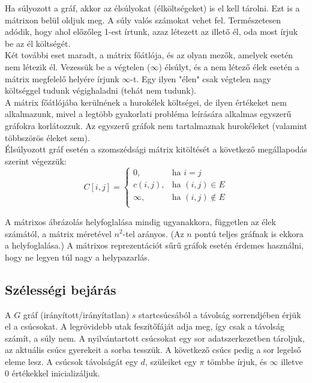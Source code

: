 \documentclass[margin=0px]{article}
\begin{document}
    \noindent Ha súlyozott a gráf, akkor az élsúlyokat (élköltségeket) is el kell tárolni. Ezt is a mátrixon belül oldjuk meg. A súly valós számokat vehet fel. Természetesen adódik, hogy ahol előzőleg 1-est írtunk, azaz létezett az illető él, oda most írjuk be az él költségét.\\

    \noindent Két további eset maradt, a mátrix főátlója, és az olyan mezők, amelyek esetén nem létezik él. Vezessük be a végtelen ($\infty$) élsúlyt, és a nem létező élek esetén a mátrix megfelelő helyére írjunk $\infty$-t. Egy ilyen "élen" csak végtelen nagy költséggel tudunk végighaladni (tehát nem tudunk).\\

    \noindent A mátrix főátlójába kerülnének a hurokélek költségei, de ilyen értékeket nem alkalmazunk, mivel a legtöbb gyakorlati probléma leírására alkalmas egyszerű gráfokra korlátozzuk. Az egyszerű gráfok nem tartalmaznak hurokéleket (valamint többszörös éleket sem).\\

    \noindent Élsúlyozott gráf esetén a szomszédsági mátrix kitöltését a következő megállapodás szerint végezzük:
    \[
        C[i,j] = \left\{\begin{array}{lr}
        0, & \text{ha } i = j\\
        c(i, j), & \text{ha } (i, j) \in E\\
        \infty, & \text{ha } (i, j) \not\in E\\
        \end{array}\right.
    \]

    \noindent A mátrixos ábrázolás helyfoglalása mindig ugyanakkora, független az élek számától, a mátrix méretével $n^2$-tel arányos. (Az $n$ pontú teljes gráfnak is ekkora a helyfoglalása.) A mátrixos reprezentációt sűrű gráfok esetén érdemes használni, hogy ne legyen túl nagy a helypazarlás.

	\subsection*{Szélességi bejárás}

    A $G$ gráf (irányított/irányítatlan) $s$ startcsúcsából a távolság sorrendjében érjük el a csúcsokat. A legrövidebb utak feszítőfáját adja meg, így csak a távolság számít, a súly nem. A nyilvántartott csúcsokat egy sor adatszerkezetben tároljuk, az aktuális csúcs gyerekeit a sorba tesszük. A következő csúcs pedig a sor legelső eleme lesz. A csúcsok távolságát egy $d$, szüleiket egy $\pi$ tömbbe írjuk, és $\infty$ illetve $0$ értékekkel inicializáljuk.
\end{document}
